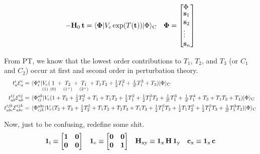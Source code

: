 \documentclass[11pt]{article}
\numberwithin{equation}{section}
\begin{document}
\begin{align}
-
  \bo{H}_0\,
  \bo{t}
=
  \ip{\bm{\F}|
    V_\mr{c}\,
    \mr{exp}(T(\bo{t}))
  |\F}_\mr{C}
&&
  \bm{\F}
=
  \pma[l]{
    \F
  \\[-3pt]
    \bo{s}_1
  \\
    \bo{s}_2
  \\
    \vd
  \\
    \bo{s}_n
  }
\end{align}

\begin{rmk}
From PT, we know that the lowest order contributions to $T_1$, $T_2$, and $T_3$ (or $C_1$ and $C_2$) occur at first and second order in perturbation theory.
\begin{align}
  t_a^i
  \mathcal{E}_a^i
=&\
  \langle\Phi _i^a|
  \underset{(1)}{\vphantom{(}
    V_{\mathrm{c}}
  }
    (
    \underset{(0)}{\vphantom{(}
      1
    }
    +
    \underset{(1^{+})}{\vphantom{(}
      T_2
    }
    +
    \underset{(2^{+})}{\vphantom{(}
      T_1
    }
    +
      T_1T_2
    +
      \tfrac{1}{2}
      T_1^2
    +
      \tfrac{1}{3!}
      T_1^3
    +
      T_3
    )
  |\Phi \rangle_{\mathrm{C}}
\\
  t_{ab}^{ij}
  \mathcal{E}_{ab}^{ij}
=&\
  \langle\Phi _{ij}^{ab}|
    V_{\mathrm{c}}
    (
      1
    +
      T_2
    +
      \tfrac{1}{2}
      T_2^2
    +
      T_1
    +
      T_1T_2
    +
      \tfrac{1}{2}
      T_1^2
    +
      \tfrac{1}{2}
      T_1^2T_2
    +
      \tfrac{1}{3!}
      T_1^3
    +
      \tfrac{1}{4!}
      T_1^4
    +
      T_3
    +
      T_1T_3
    +
      T_4
    )
  |\Phi \rangle_{\mathrm{C}}
\\
  t_{abc}^{ijk}
  \mathcal{E}_{abc}^{ijk}
=&\
  \langle\Phi _{ijk}^{abc}|
    V_{\mathrm{c}}
    (
      T_2
    +
      T_3
    +
      \tfrac{1}{2}
      T_2^2
    +
      T_1T_2
    +
      T_2T_3
    +
      T_1T_3
    +
      \tfrac{1}{2}
      T_1^2T_2
    +
      \tfrac{1}{2}
      T_1T_2^2
    +
      \tfrac{1}{2}
      T_1^2T_3
    +
      \tfrac{1}{3!}
      T_1^3T_2
    )
  |\Phi \rangle_{\mathrm{C}}
\end{align}
\end{rmk}

Now, just to be confusing, redefine some shit.
\begin{align}
  \bo{1}_\mr{i}
\equiv
\pma[l]{
  \bo{1} & \bo{0} \\
  \bo{0} & \bo{0}
}
&&
  \bo{1}_\mr{e}
\equiv
\pma[l]{
  \bo{0} & \bo{0} \\
  \bo{0} & \bo{1}
}
&&
  \bo{H}_\mr{xy}
\equiv
  \bo{1}_\mr{x}\,
  \bo{H}\,
  \bo{1}_\mr{y}
&&
  \bo{c}_\mr{x}
\equiv
  \bo{1}_\mr{x}\,
  \bo{c}
\end{align}
\end{document}
